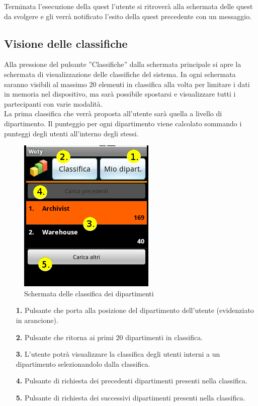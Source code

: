 Terminata l'esecuzione della quest l'utente si ritroverà alla schermata delle quest da svolgere e gli verrà notificato l'esito della quest precedente con un messaggio.

\subsection{Visione delle classifiche}

Alla pressione del pulsante ''Classifiche'' dalla schermata principale si apre la schermata di visualizzazione delle classifiche del sistema. In ogni schermata saranno visibili al massimo 20 elementi in classifica alla volta per limitare i dati in memoria nel dispositivo, ma sarà possibile spostarsi e visualizzare tutti i partecipanti con varie modalità.\\
La prima classifica che verrà proposta all'utente sarà quella a livello di dipartimento.
Il punteggio per ogni dipartimento viene calcolato sommando i punteggi degli utenti all'interno degli stessi.

\begin{center}
\begin{figure}[H]
\centering
\includegraphics[scale=0.55]{images/workgroupsranks.png}
\caption{ Schermata delle classifica dei dipartimenti }
\end{figure}
\end{center}

\begin{itemize}
	\item[\textbf{1.}] Pulsante che porta alla posizione del dipartimento dell'utente (evidenziato in arancione).
	\item[\textbf{2.}] Pulsante che ritorna ai primi 20 dipartimenti in classifica.
	\item[\textbf{3.}] L'utente potrà visualizzare la classifica degli utenti interni a un dipartimento selezionandolo dalla classifica.
	\item[\textbf{4.}] Pulsante di richiesta dei precedenti dipartimenti presenti nella classifica.
	\item[\textbf{5.}] Pulsante di richiesta dei successivi dipartimenti presenti nella classifica.
\end{itemize}

